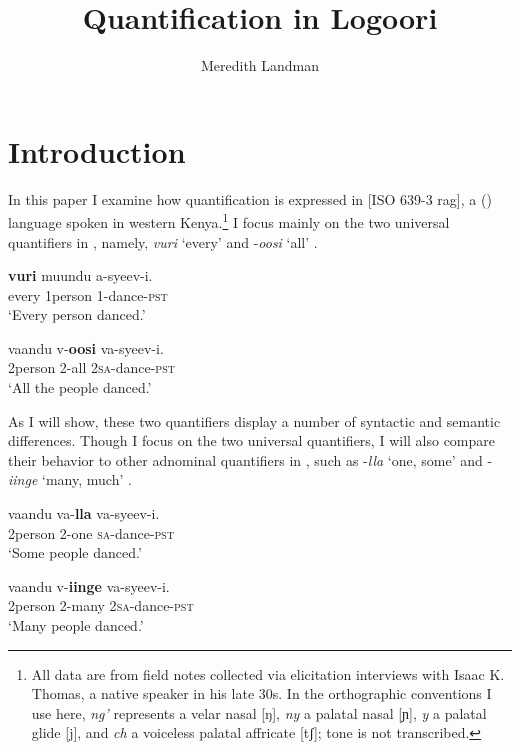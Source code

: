 \documentclass[output=paper]{langsci/langscibook}
\title{Quantification in Logoori}
\author{%
 Meredith Landman \affiliation{Pomona College} 
}
\begin{document}
 
 

\section{Introduction}

In this paper I examine how quantification is expressed in  [ISO 639-3
{rag}], a  () language spoken in western Kenya.\footnote{All data are from field notes collected via elicitation interviews with Isaac K. Thomas, a native  speaker in his late 30s. In the orthographic conventions I use here, \textit{ng'} represents a velar nasal [ŋ], \textit{ny} a palatal nasal [ɲ], \textit{y} a palatal glide [j], and \textit{ch} a voiceless palatal affricate [tʃ]; tone is not transcribed.
} I focus mainly on the two universal quantifiers in , namely, \textit{vuri} ‘every’  and -\textit{oosi} ‘all’ .

\ea\label{ex:landman:1}
\ea\label{ex:landman:1a}
\gll \textbf{vuri}  muundu  a-syeev-i.\\
     every  1person  1-dance-\textsc{pst}\\
\glt ‘Every person danced.’

\ex\label{ex:landman:1b}
\gll   vaandu  v-\textbf{oosi}    va-syeev-i.\\
     2person  2-all    2\textsc{sa}-dance-\textsc{pst}\\
\glt ‘All the people danced.’
\z
\z

As I will show, these two quantifiers display a number of syntactic and semantic differences. Though I focus on the two universal quantifiers, I will also compare their behavior to other adnominal quantifiers in , such as -\textit{lla} ‘one, some’  and -\textit{iinge} ‘many, much’ .


\ea\label{ex:landman:2} 
\ea\label{ex:landman:2a} 
\gll   vaandu  va-\textbf{lla}    va-syeev-i.\\
       2person	2-one            \textsc{sa}-dance-\textsc{pst}\\
\glt ‘Some people danced.’


\ex\label{ex:landman:2b} 
 \gll vaandu  v-\textbf{iinge}  va-syeev-i.\\
     2person  2-many  2\textsc{sa}-dance-\textsc{pst}\\
\glt ‘Many people danced.’\\
\z
\z
\end{document}
